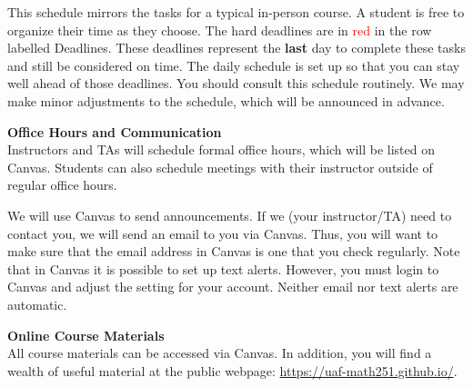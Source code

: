 \documentclass[12pt]{article}
\renewcommand{\emph}[1]{\textsf{\textbf{#1}}}
\newcommand{\localhead}[1]{\par\smallskip\textbf{#1}\nobreak\\}%
\def\heading#1{\localhead{\large\emph{#1}}}
\begin{document}
This schedule mirrors the tasks for a typical
in-person course. A student is free to organize their time as they choose. The hard deadlines are in
\textcolor{red}{red} in the row labelled Deadlines. These deadlines represent the \textbf{last} day to complete these tasks
and still be considered on time. The daily schedule is set up so that you can stay well ahead of
those deadlines. You should consult this schedule routinely. We may make minor adjustments to
the schedule, which will be announced in advance.

\heading{Office Hours and Communication}
Instructors and TAs will schedule formal office hours, which will be listed on Canvas. Students can also schedule meetings with their instructor outside of regular office hours.

We will use Canvas to send announcements. If we (your instructor/TA) need to contact you, we will send an email to you via Canvas. Thus, you will
want to make sure that the email address in Canvas is one that you check regularly. Note that in
Canvas it is possible to set up text alerts. However, you must login to Canvas and adjust the setting
for your account. Neither email nor text alerts are automatic.


\heading{Online Course Materials}
All course materials can be accessed via Canvas. In addition, you will find a wealth of useful material at the public webpage: \href{https://uaf-math251.github.io/}{https://uaf-math251.github.io/}.\\

\end{document}
